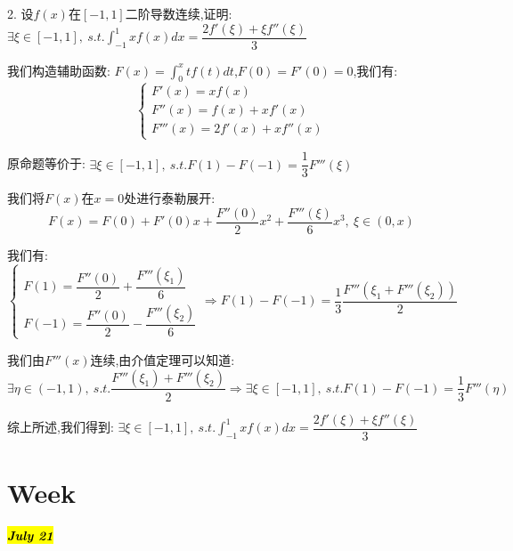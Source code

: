 2. 设$f(x)$在$[-1,1]$二阶导数连续,证明: $\exists \xi\in[-1,1],\ s.t. \int_{-1}^{1}xf(x)dx=\dfrac{2f'(\xi)+\xi f''(\xi)}{3}$
\begin{solution}
	
	我们构造辅助函数: $F(x)=\int_{0}^{x}tf(t)dt$,$F(0)=F'(0)=0$,我们有: $$\left\lbrace
	\begin{array}{l}
		F'(x)=xf(x)\\F''(x)=f(x)+xf'(x)\\F'''(x)=2f'(x)+xf''(x)
	\end{array}
	\right. $$
	
	原命题等价于: $\exists \xi\in[-1,1],\ s.t. F(1)-F(-1)=\dfrac{1}{3}F'''(\xi)$
	
	我们将$F(x)$在$x=0$处进行泰勒展开: 
	$$F(x)=F(0)+F'(0)x+\dfrac{F''(0)}{2}x^2+\dfrac{F'''(\xi)}{6}x^3, \ \xi\in(0,x) $$
	
	我们有: 
	$$\left\lbrace
	\begin{array}{l}
		F(1)=\dfrac{F''(0)}{2}+\dfrac{F'''(\xi_{1})}{6}\\
		F(-1)=\dfrac{F''(0)}{2}-\dfrac{F'''(\xi_{2})}{6}
	\end{array}
	\right. \Rightarrow F(1)-F(-1)=\dfrac{1}{3}\dfrac{F'''(\xi_{1}+F'''(\xi_{2}))}{2}$$
	
	我们由$F'''(x)$连续,由介值定理可以知道: 
	$$\exists \eta\in(-1,1),\ s.t. \dfrac{F'''(\xi_{1})+F'''(\xi_{2})}{2}\Rightarrow \exists \xi\in[-1,1],\ s.t. F(1)-F(-1)=\dfrac{1}{3}F'''(\eta)$$
	
	综上所述,我们得到: $\exists \xi\in[-1,1],\ s.t. \int_{-1}^{1}xf(x)dx=\dfrac{2f'(\xi)+\xi f''(\xi)}{3}$
\end{solution}
\section{Week }

\hl{\textbf{\textit{July 21}}}

